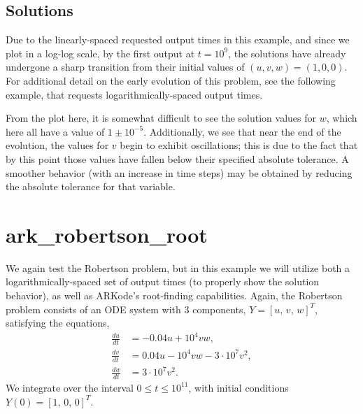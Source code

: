 \documentclass[letterpaper,10pt,english]{sphinxmanual}
\begin{document}
\subsection{Solutions}
\label{\detokenize{c_serial:id14}}
Due to the linearly-spaced requested output times in this example, and
since we plot in a log-log scale, by the first output at
\(t=10^9\), the solutions have already undergone a sharp
transition from their initial values of \((u,v,w) = (1, 0, 0)\).
For additional detail on the early evolution of this problem, see the
following example, that requests logarithmically-spaced output times.

From the plot here, it is somewhat difficult to see the solution
values for \(w\), which here all have a value of
\(1 \pm 10^{-5}\).  Additionally, we see that near the end of the
evolution, the values for \(v\) begin to exhibit oscillations;
this is due to the fact that by this point those values have fallen
below their specified absolute tolerance.  A smoother behavior (with
an increase in time steps) may be obtained by reducing the absolute
tolerance for that variable.

\begin{figure}[htbp]
\centering

\noindent{}
\end{figure}


\section{ark\_robertson\_root}
\label{\detokenize{c_serial:ark-robertson-root}}\label{\detokenize{c_serial:id15}}
We again test the Robertson problem, but in this example we will
utilize both a logarithmically-spaced set of output times (to properly
show the solution behavior), as well as ARKode’s root-finding
capabilities.  Again, the Robertson problem consists of an ODE system
with 3 components, \(Y = [u,\, v,\, w]^T\), satisfying the equations,
\begin{equation*}
\begin{split}\frac{du}{dt} &= -0.04 u + 10^4 v w, \\
\frac{dv}{dt} &= 0.04 u - 10^4 v w - 3\cdot10^7 v^2, \\
\frac{dw}{dt} &= 3\cdot10^7 v^2.\end{split}
\end{equation*}
We integrate over the interval \(0\le t\le 10^{11}\), with initial
conditions  \(Y(0) = [1,\, 0,\, 0]^T\).
\end{document}
